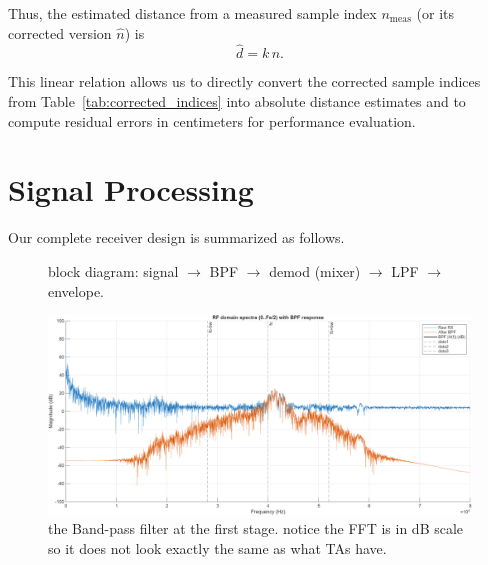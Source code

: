 \documentclass[10pt]{article}
\begin{document}
Thus, the estimated distance from a measured sample index $n_{\mathrm{meas}}$ (or its corrected version $\hat{n}$) is
\[
\hat{d} = k \, n.
\]

This linear relation allows us to directly convert the corrected sample indices from
Table~\ref{tab:corrected_indices} into absolute distance estimates and to compute residual
errors in centimeters for performance evaluation.



\section{Signal Processing}
Our complete receiver design is summarized as follows.
\begin{figure}[h!]
\centering
{}
\caption{block diagram: signal $\rightarrow$ BPF $\rightarrow$ demod (mixer) $\rightarrow$ LPF $\rightarrow$ envelope.}
\label{fig:sp-chain}
\end{figure}


\begin{figure}[!h]
	\centering 
		\includegraphics[width = .75\columnwidth]{fig/100_fdomain_bpf.png}	
	\caption{the Band-pass filter at the first stage. notice the FFT is in dB scale so it does not look exactly the same as what TAs have.}
\label{fig:bpf}
\end{figure}
\end{document}
